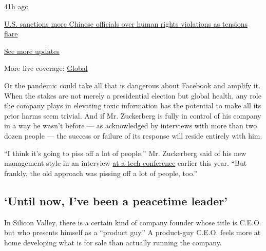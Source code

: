 \href{https://www.nytimes3xbfgragh.onion/live/2020/07/31/business/stock-market-today-coronavirus?action=click\&pgtype=Article\&state=default\&region=MAIN_CONTENT_1\&context=storylines_live_updates\#us-sanctions-more-chinese-officials-over-human-rights-violations-as-tensions-flare}{41h
ago}

\href{https://www.nytimes3xbfgragh.onion/live/2020/07/31/business/stock-market-today-coronavirus?action=click\&pgtype=Article\&state=default\&region=MAIN_CONTENT_1\&context=storylines_live_updates\#us-sanctions-more-chinese-officials-over-human-rights-violations-as-tensions-flare}{U.S.
sanctions more Chinese officials over human rights violations as
tensions flare}

\href{https://www.nytimes3xbfgragh.onion/live/2020/07/31/business/stock-market-today-coronavirus?action=click\&pgtype=Article\&state=default\&region=MAIN_CONTENT_1\&context=storylines_live_updates}{See
more updates}

More live coverage:
\href{https://www.nytimes3xbfgragh.onion/2020/08/01/world/coronavirus-covid-19.html?action=click\&pgtype=Article\&state=default\&region=MAIN_CONTENT_1\&context=storylines_live_updates}{Global}

Or the pandemic could take all that is dangerous about Facebook and
amplify it. When the stakes are not merely a presidential election but
global health, any role the company plays in elevating toxic information
has the potential to make all its prior harms seem trivial. And if Mr.
Zuckerberg is fully in control of his company in a way he wasn't before
--- as acknowledged by interviews with more than two dozen people ---
the success or failure of its response will reside entirely with him.

``I think it's going to piss off a lot of people,'' Mr. Zuckerberg said
of his new management style in an interview
\href{https://www.cnbc.com/2020/01/31/mark-zuckerberg-silicon-slopes-speech-honesty-will-piss-off-people.html}{at
a tech conference} earlier this year. ``But frankly, the old approach
was pissing off a lot of people, too.''

\hypertarget{until-now-ive-been-a-peacetime-leader}{%
\subsection{`Until now, I've been a peacetime
leader'}\label{until-now-ive-been-a-peacetime-leader}}

In Silicon Valley, there is a certain kind of company founder whose
title is C.E.O. but who presents himself as a ``product guy.'' A
product-guy C.E.O. feels more at home developing what is for sale than
actually running the company.

